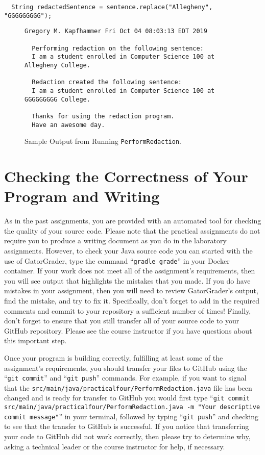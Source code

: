 \documentclass[11pt]{article}
\newcommand{\mainprogram}{\lstinline{PerformRedaction}}
\newcommand{\mainprogramsource}{\lstinline{src/main/java/practicalfour/PerformRedaction.java}}
\newcommand{\gatorgraderstart}{\command{gradle grade}}
\newcommand{\gitcommit}{\command{git commit}}
\newcommand{\gitpush}{\command{git push}}
\newcommand{\gitcommitmainprogram}{\command{git commit src/main/java/practicalfour/PerformRedaction.java -m "Your
descriptive commit message"}}
\newcommand{\command}[1]{``\lstinline{#1}''}
\begin{document}
\begin{verbatim}
  String redactedSentence = sentence.replace("Allegheny", "GGGGGGGGG");
\end{verbatim}

\begin{figure}[tb]
\begin{Verbatim}[commandchars=\\\{\}]
  Gregory M. Kapfhammer Fri Oct 04 08:03:13 EDT 2019

  Performing redaction on the following sentence:
  I am a student enrolled in Computer Science 100 at Allegheny College.

  Redaction created the following sentence:
  I am a student enrolled in Computer Science 100 at GGGGGGGGG College.

  Thanks for using the redaction program.
  Have an awesome day.
\end{Verbatim}
\vspace*{-.1in}
\caption{Sample Output from Running \mainprogram.}
\label{mad}
\end{figure}

\section*{Checking the Correctness of Your Program and Writing}

As in the past assignments, you are provided with an automated tool for checking
the quality of your source code. Please note that the practical assignments do
not require you to produce a writing document as you do in the laboratory
assignments. However, to check your Java source code you can started with the
use of GatorGrader, type the command \gatorgraderstart{} in your Docker
container. If your work does not meet all of the assignment's requirements, then
you will see output that highlights the mistakes that you made. If you do have
mistakes in your assignment, then you will need to review GatorGrader's output,
find the mistake, and try to fix it. Specifically, don't forget to add in the
required comments and commit to your repository a sufficient number of times!
Finally, don't forget to ensure that you still transfer all of your source code
to your GitHub repository. Please see the course instructor if you have
questions about this important step.

Once your program is building correctly, fulfilling at least some of the
assignment's requirements, you should transfer your files to GitHub using the
\gitcommit{} and \gitpush{} commands. For example, if you want to signal that
the \mainprogramsource{} file has been changed and is ready for transfer to
GitHub you would first type \gitcommitmainprogram{} in your terminal, followed
by typing \gitpush{} and checking to see that the transfer to GitHub is
successful. If you notice that transferring your code to GitHub did not work
correctly, then please try to determine why, asking a technical leader or the
course instructor for help, if necessary.
\end{document}
